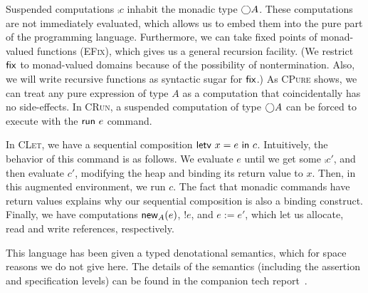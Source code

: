 \documentclass[preprint,natbib]{sigplanconf}
\begin{document}
Suspended computations $\comp{c}$ inhabit the monadic type
$\bigcirc{A}$.  These computations are not immediately evaluated, which
allows us to embed them into the pure part of the programming
language. Furthermore, we can take fixed points of monad-valued
functions (\textsc{EFix}), which gives us a general recursion
facility. (We restrict $\mbox{\textsf{{fix}}}$ to monad-valued domains because
of the possibility of nontermination. Also, we will write recursive
functions as syntactic sugar for $\mbox{\textsf{{fix}}}$.)  As \textsc{CPure}
shows, we can treat any pure expression of type $A$ as a computation
that coincidentally has no side-effects.  In \textsc{CRun}, a
suspended computation of type $\bigcirc{A}$ can be forced to execute
with the $\mbox{\textsf{{run }}}{e}$ command.

In \textsc{CLet}, we have a sequential composition
$\mbox{\textsf{{letv }}}x = e\mbox{\textsf{{ in }}}c$. Intuitively, the behavior of this command is as
follows. We evaluate $e$ until we get some $\comp{c'}$, and then
evaluate $c'$, modifying the heap and binding its return value to
$x$. Then, in this augmented environment, we run $c$. The fact that
monadic commands have return values explains why our sequential
composition is also a binding construct. Finally, we have computations
$\mbox{\textsf{{new}}}_{A} (e)$, $!e$, and $e := e'$, which let us allocate, read
and write references, respectively.

This language has been given a typed denotational semantics, which for
space reasons we do not give here. The details of the semantics
(including the assertion and specification levels) can be found in the
companion tech report~\cite{tech-report}.
\end{document}

